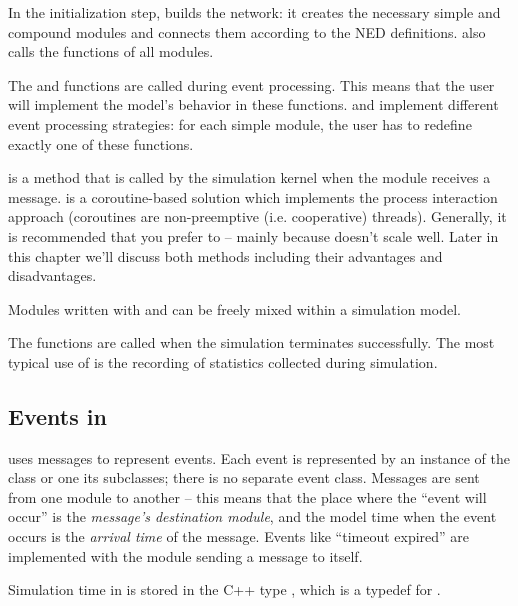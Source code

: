 In the initialization step, {\opp} builds the network: it creates the
necessary simple and compound modules and
connects them according to the NED definitions. {\opp} also calls the
 functions of all modules.

The  and  functions are
called during event processing. This means that the user will
implement the model's behavior in these functions.
 and  implement
different event processing strategies: for each simple module, the user
has to redefine exactly one of these functions.

 is a method that is called
by the simulation kernel when the module receives a message.
 is a coroutine-based solution
which implements the process interaction approach (coroutines are
non-preemptive (i.e. cooperative) threads). Generally, it is recommended
that you prefer  to  --
mainly because  doesn't scale well.
Later in this chapter we'll discuss both methods including their advantages
and disadvantages.

Modules written with  and 
can be freely mixed within a simulation model.

The  functions are called when the simulation
terminates successfully. The most typical use of 
is the recording of statistics collected during simulation.



\subsection{Events in {\opp}}

{\opp} uses messages to represent
events. Each event is represented by an instance of the
 class or one its subclasses; there is no separate
event class. Messages are sent from one module to another -- this
means that the place where the ``event will occur'' is the
\textit{message's destination module}, and the model time when the
event occurs is the \textit{arrival time} of the
message. Events like ``timeout expired'' are implemented with the
module sending a message to itself.

Simulation time in {\opp} is stored in the C++ type
, which is a typedef for .

